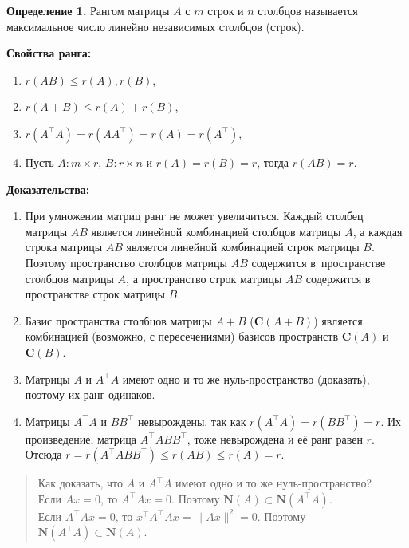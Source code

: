\documentclass[11pt,a4paper]{article}
\providecommand{\tightlist}{%
      \setlength{\itemsep}{0pt}\setlength{\parskip}{0pt}}
\begin{document}
    \textbf{Определение 1.} Рангом матрицы \(A\) с \(m\) строк и \(n\)
столбцов называется максимальное число линейно независимых столбцов
(строк).

    \textbf{Свойства ранга:}

\begin{enumerate}
\def\labelenumi{\arabic{enumi}.}
\tightlist
\item
  \(r(AB) \le r(A), r(B)\),
\item
  \(r(A+B) \le r(A) + r(B)\),
\item
  \(r(A^\top A) = r(AA^\top) = r(A) = r(A^\top)\),
\item
  Пусть \(A: m \times r\), \(B: r \times n\) и \(r(A) = r(B) = r\),
  тогда \(r(AB) = r\).
\end{enumerate}

\textbf{Доказательства:}

\begin{enumerate}
\def\labelenumi{\arabic{enumi}.}
\tightlist
\item
  При умножении матриц ранг не может увеличиться. Каждый столбец матрицы \(AB\) является линейной комбинацией столбцов матрицы \(A\), а каждая строка матрицы \(AB\) является линейной комбинацией строк матрицы \(B\).
  Поэтому пространство столбцов матрицы \(AB\) содержится в~пространстве столбцов матрицы \(A\), а пространство строк матрицы \(AB\) содержится в пространстве строк матрицы \(B\).
\item
  Базис пространства столбцов матрицы \(A+B\) (\(\mathbf{C}(A+B)\))
  является комбинацией (возможно, с пересечениями) базисов пространств
  \(\mathbf{C}(A)\) и \(\mathbf{C}(B)\).
\item
  Матрицы \(A\) и \(A^\top A\) имеют одно и то же нуль-пространство
  (доказать), поэтому их ранг одинаков.
\item
  Матрицы \(A^\top A\) и \(BB^\top\) невырождены, так как
  \(r(A^\top A) = r(BB^\top) = r\). Их произведение, матрица
  \(A^\top A BB^\top\), тоже невырождена и её ранг равен \(r\). Отсюда
  \(r = r(A^\top A BB^\top) \le r(AB) \le r(A) = r\).
\end{enumerate}

    \begin{quote}
Как доказать, что \(A\) и \(A^\top A\) имеют одно и то же
нуль-пространство?\\
Если \(Ax=0\), то \(A^\top Ax = 0\). Поэтому
\(\mathbf{N}(A) \subset \mathbf{N}(A^\top A)\).\\
Если \(A^\top Ax = 0\), то \(x^\top A^\top Ax = \|Ax\|^2 = 0\). Поэтому
\(\mathbf{N}(A^\top A) \subset \mathbf{N}(A)\).
\end{quote}
\end{document}
